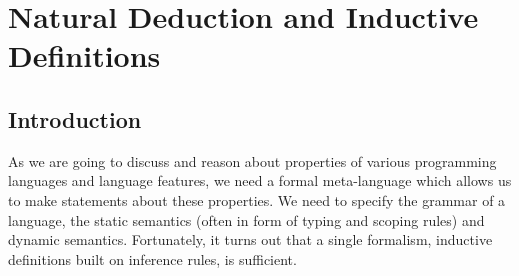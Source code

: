 \documentclass{book}
\begin{document}
\chapter{Natural Deduction and Inductive Definitions}
\section{Introduction}

As we are going to discuss and reason about properties of various programming
languages and language features, we need a formal meta-language which allows
us to make statements about these properties. We need to specify the grammar
of a language, the static semantics (often in form of typing and scoping
rules) and dynamic semantics. Fortunately, it turns out that a single
formalism, inductive definitions built on inference rules, is sufficient.
\end{document}
